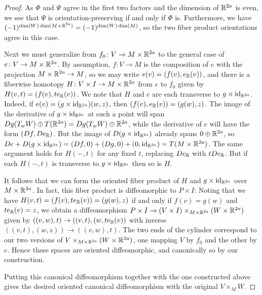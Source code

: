 \begin{proof}
	As $\Phi$ and $\Psi$ agree in the first two factors and the dimension of $\mathbb{R}^{2a}$ is even, we see that $\Psi$ is orientation-preserving if and only if $\Phi$ is.
	Furthermore, we have $(-1)^{\dim(W) \dim(M \times \mathbb{R}^{2a})} = (-1)^{\dim(W)\dim(M)}$, so the two fiber product orientations agree in this case.

	Next we must generalize from $f_0 \colon V \to M \times \mathbb{R}^{2a}$ to the general case of $e \colon V \to M \times \mathbb{R}^{2a}$.
	By assumption, $f \colon V \to M$ is the composition of $e$ with the projection $M \times \mathbb{R}^{2a} \to M$, so we may write $e(v) = (f(v), e_{\mathbb{R}}(v))$, and there is a fiberwise homotopy $H \colon V \times I \to M \times \mathbb{R}^{2a}$ from $e$ to $f_0$ given by $H(v,t) = (f(v), te_{\mathbb{R}}(v))$.
	We note that $H$ and $e$ are each transverse to $g \times \mathrm{id}_{\mathbb{R}^{2a}}$.
	Indeed, if $e(v) = (g \times \mathrm{id}_{\mathbb{R}^{2a}})(w,z)$, then $(f(v),e_{\mathbb{R}}(v)) = (g(w),z)$.
	The image of the derivative of $g \times \mathrm{id}_{\mathbb{R}^{2a}}$ at such a point will span $Dg(T_wW) \oplus T(\mathbb{R}^{2a}) = Dg(T_wW) \oplus \mathbb{R}^{2a}$, while the derivative of $e$ will have the form $(Df,De_{\mathbb{R}})$.
	But the image of $D(g \times \mathrm{id}_{\mathbb{R}^{2a}})$ already spans $0\oplus \mathbb{R}^{2a}$, so $De+D(g \times \mathrm{id}_{\mathbb{R}^{2a}}) = (Df,0)+(Dg,0)+(0,\mathrm{id}_{\mathbb{R}^{2a}}) = T(M \times \mathbb{R}^{2a})$.
	The same argument holds for $H(-,t)$ for any fixed $t$, replacing $De_{\mathbb{R}}$ with $tDe_{\mathbb{R}}$.
	But if each $H(-,t)$ is transverse to $g \times \mathrm{id}_{\mathbb{R}^{2a}}$ then so is $H$.

	It follows that we can form the oriented fiber product of $H$ and $g \times \mathrm{id}_{\mathbb{R}^{2a}}$ over $M \times \mathbb{R}^{2a}$.
	In fact, this fiber product is diffeomorphic to $P \times I$: Noting that we have $H(v,t) = (f(v),te_{\mathbb{R}}(v)) = (g(w),z)$ if and only if $f(v) = g(w)$ and $te_{\mathbb{R}}(v) = z$, we obtain a diffeomorphism $P \times I \to (V \times I)\times_{M \times \mathbb{R}^{2a}}(W \times \mathbb{R}^{2a})$ given by $((v,w),t) \to ((v,t),(w, te_{\mathbb{R}}(v))$ with inverse $((v,t),(w,z)) \to ((v,w),t)$.
	The two ends of the cylinder correspond to our two versions of $V\times_{M \times \mathbb{R}^{2a}} (W \times \mathbb{R}^{2a})$, one mapping $V$ by $f_0$ and the other by $e$.
	Hence these spaces are oriented diffeomorphic, and canonically so by our construction.

	Putting this canonical diffeomorphism together with the one constructed above gives the desired oriented canonical diffeomorphism with the original $V \times_M W$.
\end{proof}

